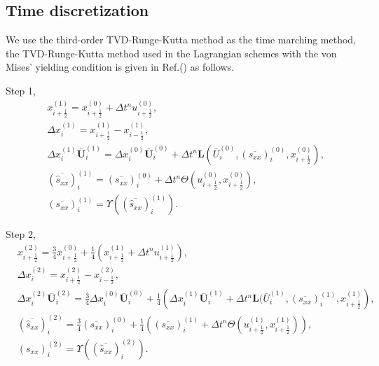 \documentclass[review]{elsarticle}
\begin{document}
\subsection{Time discretization}
We use the third-order TVD-Runge-Kutta method \cite{shu1988efficient}  as the time marching method, the TVD-Runge-Kutta method used in the Lagrangian schemes with  the von Mises' yielding condition is given in Ref.(\cite{cheng2016harten}) as follows.

Step 1,
\begin{equation}
  \begin{aligned}
    & x_{i+\frac{1}{2}}^{(1)} = x_{i+\frac{1}{2}}^{(0)}+\Delta t^n u_{i+\frac{1}{2}}^{(0)},\\
    & \Delta x_i^{(1)} =  x_{i+\frac{1}{2}}^{(1)}- x_{i-\frac{1}{2}}^{(1)},\\
    & \Delta x_i^{(1)} \overline{\mathbf{U}}_i^{(1)}= \Delta x_i^{(0)} \overline{\mathbf{U}}_i^{(0)}+\Delta t^n \mathbf{L}(\overline{U}_i^{(0)}, (\overline{s_{xx}})_i^{(0)}, x_{i+\frac{1}{2}}^{(0)}),\\
    & (\overline{\hat{s}_{xx}})_i^{(1)} = (\overline{s_{xx}})_i^{(0)} +\Delta t^ n  \varTheta (u_{i+\frac{1}{2}}^{(0)}, x_{i+\frac{1}{2}}^{(0)}),\\
  & (\overline{s_{xx}})_i^{(1)} = \Upsilon((\overline{\hat{s}_{xx}})_i^{(1)}).
\end{aligned}
\end{equation}


Step 2,
\begin{equation}
  \begin{aligned}
    & x_{i+\frac{1}{2}}^{(2)} = \frac{3}{4} x_{i+\frac{1}{2}}^{(0)}+\frac{1}{4} \left( x_{i+\frac{1}{2}}^{(1)}+\Delta t^n u_{i+\frac{1}{2}}^{(1)}\right),\\
    & \Delta x_i^{(2)} =  x_{i+\frac{1}{2}}^{(2)}- x_{i-\frac{1}{2}}^{(2)},\\
    & \Delta x_i^{(2)} \overline{\mathbf{U}}_i^{(2)}  = \frac{3}{4} \Delta x_i^{(0)} \overline{\mathbf{U}}_i^{(0)}+ \frac{1}{4} \left(  \Delta x_i^{(1)} \overline{\mathbf{U}}_i^{(1)} + \Delta t^n \mathbf{L}(\overline{U}_i^{(1)}, (\overline{s_{xx}})_i^{(1)}, x_{i+\frac{1}{2}}^{(1)}\right),\\
    & (\overline{\hat{s}_{xx}})_i^{(2)} =\frac{3}{4} (\overline{s_{xx}})_i^{(0)} + \frac{1}{4} \left(  (\overline{s_{xx}})_i^{(1)}+\Delta t^ n \varTheta (u_{i+\frac{1}{2}}^{(1)}, x_{i+\frac{1}{2}}^{(1)})\right),\\
  & (\overline{s_{xx}})_i^{(2)} = \Upsilon((\overline{\hat{s}_{xx}})_i^{(2)}).
\end{aligned}
\end{equation}
\end{document}

